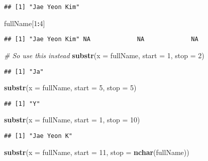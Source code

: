 \documentclass[
]{book}
\newenvironment{Shaded}{\begin{snugshade}}{\end{snugshade}}
\newcommand{\CommentTok}[1]{\textcolor[rgb]{0.56,0.35,0.01}{\textit{#1}}}
\newcommand{\DataTypeTok}[1]{\textcolor[rgb]{0.13,0.29,0.53}{#1}}
\newcommand{\DecValTok}[1]{\textcolor[rgb]{0.00,0.00,0.81}{#1}}
\newcommand{\KeywordTok}[1]{\textcolor[rgb]{0.13,0.29,0.53}{\textbf{#1}}}
\newcommand{\NormalTok}[1]{#1}
\newcommand{\OperatorTok}[1]{\textcolor[rgb]{0.81,0.36,0.00}{\textbf{#1}}}
\begin{document}
\begin{verbatim}
## [1] "Jae Yeon Kim"
\end{verbatim}

\begin{Shaded}
\begin{Highlighting}[]
\NormalTok{fullName[}\DecValTok{1}\OperatorTok{:}\DecValTok{4}\NormalTok{]}
\end{Highlighting}
\end{Shaded}

\begin{verbatim}
## [1] "Jae Yeon Kim" NA             NA             NA
\end{verbatim}

\begin{Shaded}
\begin{Highlighting}[]
\CommentTok{\# So use this instead}
\KeywordTok{substr}\NormalTok{(}\DataTypeTok{x =}\NormalTok{ fullName, }\DataTypeTok{start =} \DecValTok{1}\NormalTok{, }\DataTypeTok{stop =} \DecValTok{2}\NormalTok{)}
\end{Highlighting}
\end{Shaded}

\begin{verbatim}
## [1] "Ja"
\end{verbatim}

\begin{Shaded}
\begin{Highlighting}[]
\KeywordTok{substr}\NormalTok{(}\DataTypeTok{x =}\NormalTok{ fullName, }\DataTypeTok{start =} \DecValTok{5}\NormalTok{, }\DataTypeTok{stop =} \DecValTok{5}\NormalTok{)}
\end{Highlighting}
\end{Shaded}

\begin{verbatim}
## [1] "Y"
\end{verbatim}

\begin{Shaded}
\begin{Highlighting}[]
\KeywordTok{substr}\NormalTok{(}\DataTypeTok{x =}\NormalTok{ fullName, }\DataTypeTok{start =} \DecValTok{1}\NormalTok{, }\DataTypeTok{stop =} \DecValTok{10}\NormalTok{)}
\end{Highlighting}
\end{Shaded}

\begin{verbatim}
## [1] "Jae Yeon K"
\end{verbatim}

\begin{Shaded}
\begin{Highlighting}[]
\KeywordTok{substr}\NormalTok{(}\DataTypeTok{x =}\NormalTok{ fullName, }\DataTypeTok{start =} \DecValTok{11}\NormalTok{, }\DataTypeTok{stop =} \KeywordTok{nchar}\NormalTok{(fullName))}
\end{Highlighting}
\end{Shaded}
\end{document}
